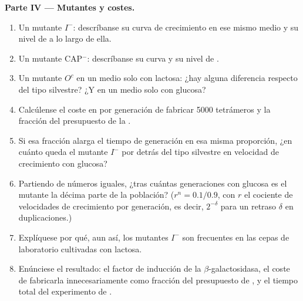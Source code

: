 \begin{problem}
\medskip
\noindent\textbf{Parte IV --- Mutantes y costes.}
\begin{enumerate}[resume]
  \item Un mutante $I^-$: descríbanse su curva de crecimiento en ese mismo
        medio y su nivel de  a lo largo de ella.
  \item Un mutante CAP$^-$: descríbanse su curva y su nivel de .
  \item Un mutante $O^c$ en un medio solo con lactosa: ¿hay alguna
        diferencia respecto del tipo silvestre? ¿Y en un medio solo con
        glucosa?
  \item Calcúlense el coste en  por generación de fabricar \num{5000}
        tetrámeros y la fracción del presupuesto de la .
  \item Si esa fracción alarga el tiempo de generación en esa misma
        proporción, ¿en cuánto queda el mutante $I^-$ por detrás del tipo
        silvestre en velocidad de crecimiento con glucosa?
  \item Partiendo de números iguales, ¿tras cuántas generaciones con
        glucosa es el mutante la décima parte de la población? ($r^n =
        0.1/0.9$, con $r$ el cociente de velocidades de crecimiento por
        generación, es decir, $2^{-\delta}$ para un retraso $\delta$ en
        duplicaciones.)
  \item Explíquese por qué, aun así, los mutantes $I^-$ son frecuentes en
        las cepas de laboratorio cultivadas con lactosa.
  \item Enúnciese el resultado: el factor de inducción de la
        $\beta$-galactosidasa, el coste de fabricarla innecesariamente como
        fracción del presupuesto de , y el tiempo total del experimento
        de .
\end{enumerate}
\end{problem}
